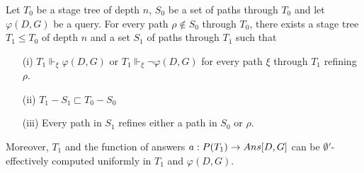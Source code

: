 \begin{lemma}\label{lem:sq-one-step-forcing}
Let $T_0$ be a stage tree of depth $n$, $S_0$ be a set of paths through $T_0$ and let~$\varphi(D,G)$ be a query.
For every path $\rho \not \in S_0$ through $T_0$, there exists a stage tree $T_1 \leq T_0$ of depth $n$
and a set $S_1$ of paths through $T_1$ such that
\begin{itemize}
	\item[(i)] $T_1 \Vdash_\xi \varphi(D,G)$ or $T_1 \Vdash_\xi \neg \varphi(D, G)$ for every
	path $\xi$ through $T_1$ refining $\rho$.
	\item[(ii)] $T_1 - S_1 \sqsubset T_0 - S_0$
	\item[(iii)] Every path in $S_1$ refines either a path in $S_0$ or $\rho$.
\end{itemize}
Moreover, $T_1$ and the function of answers $a : P(T_1) \to \mathop{Ans}[D,G]$
can be $\emptyset'$-effectively computed uniformly in $T_1$ and $\varphi(D,G)$.
\end{lemma}
